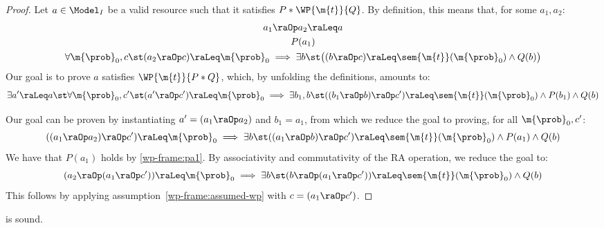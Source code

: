 \begin{proof}
  Let $a\in\Model_I$ be a valid resource such that
  it satisfies $P \ast \WP {\m{t}} {Q}$.
  By definition, this means that, for some $a_1,a_2$:
  \begin{gather}
    a_1 \raOp a_2 \raLeq a
    \\
    P(a_1)
    \label{wp-frame:pa1}
    \\
    \forall \m{\prob}_0, c \st
      (a_2 \raOp c) \raLeq \m{\prob}_0
      \implies
        \exists b \st
        \bigl(
          (b \raOp c) \raLeq \sem{\m{t}}(\m{\prob}_0)
          \land
          Q(b)
        \bigr)
    \label{wp-frame:assumed-wp}
  \end{gather}
  Our goal is to prove $a$ satisfies
  $\WP {\m{t}} {P * Q}$, which,
  by unfolding the definitions, amounts to:
  \begin{equation}
    \exists a' \raLeq a \st
    \forall \m{\prob}_0, c' \st
      (a' \raOp c') \raLeq \m{\prob}_0
      \implies
      \exists b_1,b \st
        ((b_1 \raOp b) \raOp c') \raLeq \sem{\m{t}}(\m{\prob}_0)
        \land
        P(b_1) \land Q(b)
    \label{wp-frame:goal}
  \end{equation}

  Our goal can be proven by instantiating
  $a' = (a_1 \raOp a_2)$ and $b_1 = a_1$,
  from which we reduce the goal
  to proving, for all $\m{\prob}_0, c'$:
  \begin{equation}
      ((a_1 \raOp a_2) \raOp c') \raLeq \m{\prob}_0
      \implies
      \exists b \st
        ((a_1 \raOp b) \raOp c') \raLeq \sem{\m{t}}(\m{\prob}_0)
        \land
        P(a_1) \land Q(b)
  \end{equation}
  We have that $P(a_1)$ holds by \eqref{wp-frame:pa1}.
  By associativity and commutativity of the RA operation,
  we reduce the goal to:
  \begin{equation}
      (a_2 \raOp (a_1 \raOp c')) \raLeq \m{\prob}_0
      \implies
      \exists b \st
        (b \raOp (a_1 \raOp c')) \raLeq \sem{\m{t}}(\m{\prob}_0)
        \land
        Q(b)
  \end{equation}
  This follows by applying assumption~\eqref{wp-frame:assumed-wp}
  with $c = (a_1 \raOp c')$.
\end{proof}
 \begin{lemma}
\label{proof:wp-nest}
   is sound.
\end{lemma}

